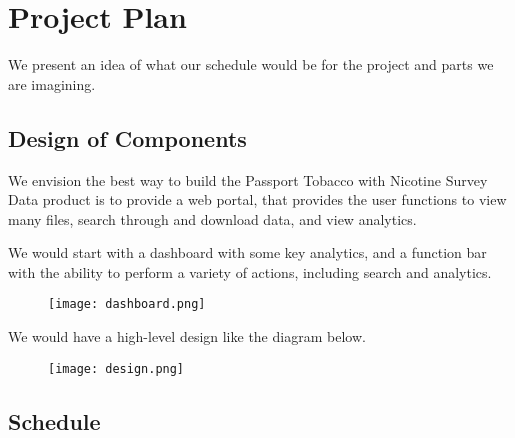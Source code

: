 \section{Project Plan}

We present an idea of what our schedule would be for the project and parts we are imagining.

\subsection{Design of Components}

We envision the best way to build the Passport Tobacco with Nicotine Survey
Data product is to provide a web portal, that provides the user functions to
view many files, search through and download data, and view analytics. 

We would start with a dashboard with some key analytics, and a function bar
with the ability to perform a variety of actions, including search and
analytics.

\begin{figure}[H]
  \centering
  \texttt{[image: dashboard.png]}
\end{figure}

We would have a high-level design like the diagram below.

\begin{figure}[H]
  \centering
  \texttt{[image: design.png]}
\end{figure}

\subsection{Schedule}

